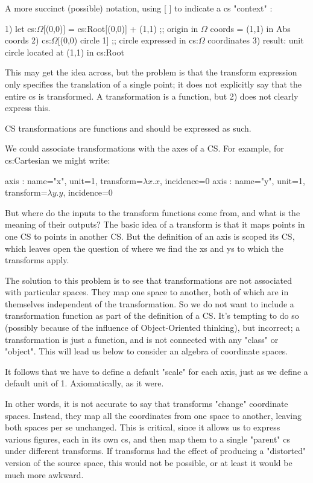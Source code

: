 \documentclass[12pt]{tufte-handout}
\numberwithin{equation}{subsection}
\numberwithin{equation}{subsection}
\begin{document}
  A more succinct (possible) notation, using [ ] to indicate a cs "context" :

  1)	  let cs:$\Omega$[(0,0)] = cs:Root[(0,0)] + (1,1)  ;; origin in $\Omega$ coords = (1,1) in Abs coords
  2)	  cs:$\Omega$[(0,0) circle 1]   ;; circle expressed in cs:$\Omega$ coordinates
  3)	  result: unit circle located at (1,1) in cs:Root

  This may get the idea across, but the problem is that the transform
  expression only specifies the translation of a single point; it does
  not explicitly say that the entire cs is transformed.  A
  transformation is a function, but 2) does not clearly express this.

  CS transformations are functions and should be expressed as such.

  We could associate transformations with the axes of a CS.  For
  example, for cs:Cartesian we might write:

  axis : {name="x", unit=1, transform=\(\lambda x.x\), incidence=0}
  axis : {name="y", unit=1, transform=\(\lambda y.y\), incidence=0}

  But where do the inputs to the transform functions come from, and what
  is the meaning of their outputs?  The basic idea of a transform is
  that it maps points in one CS to points in another CS.  But the
  definition of an axis is scoped its CS, which leaves open the question
  of where we find the xs and ys to which the transforms apply.

  The solution to this problem is to see that transformations are not
  associated with particular spaces.  They map one space to another,
  both of which are in themselves independent of the transformation.  So
  we do not want to include a transformation function as part of the
  definition of a CS.  It's tempting to do so (possibly because of the
  influence of Object-Oriented thinking), but incorrect; a
  transformation is just a function, and is not connected with any
  "class" or "object".  This will lead us below to consider an algebra
  of coordinate spaces.

  It follows that we have to define a default "scale" for each axis,
  just as we define a default unit of 1.  Axiomatically, as it were.

  In other words, it is not accurate to say that transforms "change"
  coordinate spaces.  Instead, they map all the coordinates from one
  space to another, leaving both spaces per se unchanged.  This is
  critical, since it allows us to express various figures, each in its
  own cs, and then map them to a single "parent" cs under different
  transforms.  If transforms had the effect of producing a "distorted"
  version of the source space, this would not be possible, or at least
  it would be much more awkward.
\end{document}

